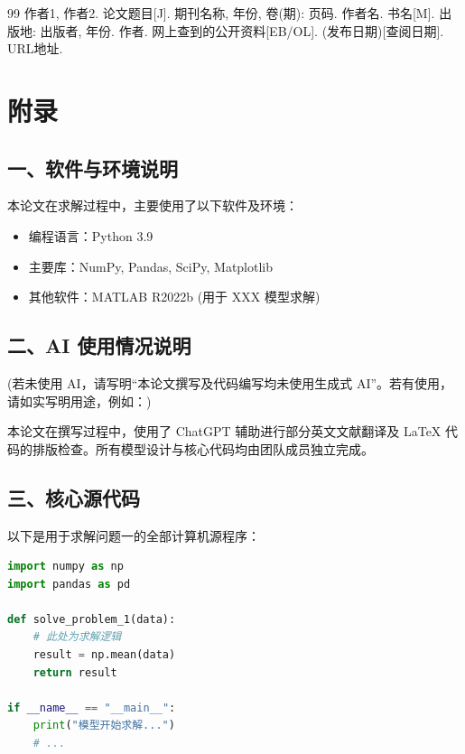 \documentclass[a4paper,12pt]{ctexart}
\begin{document}
\newpage
{}
{}
%  
\begin{thebibliography}{99}
     作者1, 作者2. 论文题目[J]. 期刊名称, 年份, 卷(期): 页码.
     作者名. 书名[M]. 出版地: 出版者, 年份.
     作者. 网上查到的公开资料[EB/OL]. (发布日期)[查阅日期]. URL地址.
\end{thebibliography}

\newpage
\appendix
\section*{附录}

\subsection*{一、软件与环境说明}
本论文在求解过程中，主要使用了以下软件及环境：
\begin{itemize}
    \item 编程语言：Python 3.9
    \item 主要库：NumPy, Pandas, SciPy, Matplotlib
    \item 其他软件：MATLAB R2022b (用于 XXX 模型求解)
\end{itemize}

\subsection*{二、AI 使用情况说明}
(若未使用 AI，请写明“本论文撰写及代码编写均未使用生成式 AI”。若有使用，请如实写明用途，例如：)
\par 本论文在撰写过程中，使用了 ChatGPT 辅助进行部分英文文献翻译及 LaTeX 代码的排版检查。所有模型设计与核心代码均由团队成员独立完成。

\subsection*{三、核心源代码}
以下是用于求解问题一的全部计算机源程序：

\begin{lstlisting}[language=Python, caption={问题一求解核心代码}]
import numpy as np
import pandas as pd

def solve_problem_1(data):
    # 此处为求解逻辑
    result = np.mean(data)
    return result

if __name__ == "__main__":
    print("模型开始求解...")
    # ...
\end{lstlisting}
\end{document}
